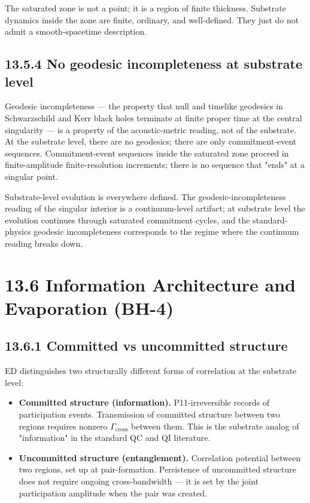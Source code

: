 \documentclass[11pt]{book}
\begin{document}
The saturated zone is not a point; it is a region of finite thickness. Substrate dynamics inside the zone are finite, ordinary, and well-defined. They just do not admit a smooth-spacetime description.

\subsection{13.5.4 No geodesic incompleteness at substrate level}

Geodesic incompleteness — the property that null and timelike geodesics in Schwarzschild and Kerr black holes terminate at finite proper time at the central singularity — is a property of the acoustic-metric reading, not of the substrate. At the substrate level, there are no geodesics; there are only commitment-event sequences. Commitment-event sequences inside the saturated zone proceed in finite-amplitude finite-resolution increments; there is no sequence that "ends" at a singular point.

Substrate-level evolution is everywhere defined. The geodesic-incompleteness reading of the singular interior is a continuum-level artifact; at substrate level the evolution continues through saturated commitment cycles, and the standard-physics geodesic incompleteness corresponds to the regime where the continuum reading breaks down.

\section{13.6 Information Architecture and Evaporation (BH-4)}

\subsection{13.6.1 Committed vs uncommitted structure}

ED distinguishes two structurally different forms of correlation at the substrate level:

\begin{itemize}
\item \textbf{Committed structure (information).} P11-irreversible records of participation events. Transmission of committed structure between two regions requires nonzero $\Gamma_\mathrm{cross}$ between them. This is the substrate analog of "information" in the standard QC and QI literature.
\item \textbf{Uncommitted structure (entanglement).} Correlation potential between two regions, set up at pair-formation. Persistence of uncommitted structure does not require ongoing cross-bandwidth — it is set by the joint participation amplitude when the pair was created.
\end{itemize}
\end{document}
